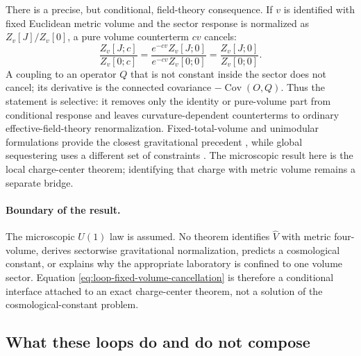 There is a precise, but conditional, field-theory consequence.  If \(v\) is
identified with fixed Euclidean metric volume and the sector response is
normalized as \(Z_v[J]/Z_v[0]\), a pure volume counterterm \(c v\) cancels:
\begin{equation}
 \frac{Z_v[J;c]}{Z_v[0;c]}
 =\frac{e^{-cv}Z_v[J;0]}{e^{-cv}Z_v[0;0]}
 =\frac{Z_v[J;0]}{Z_v[0;0]} .
 \label{eq:loop-fixed-volume-cancellation}
\end{equation}
A coupling to an operator \(Q\) that is not constant inside the sector does
not cancel; its derivative is the connected covariance
\(-\operatorname{Cov}(O,Q)\).  Thus the statement is selective: it removes
only the identity or pure-volume part from conditional response and leaves
curvature-dependent counterterms to ordinary effective-field-theory
renormalization.  Fixed-total-volume and unimodular formulations provide
the closest gravitational precedent \cite{FiolGarriga2010}, while global
sequestering uses a different set of constraints \cite{KaloperPadilla}.
The microscopic result here is the local charge-center theorem; identifying
that charge with metric volume remains a separate bridge.

\paragraph{Boundary of the result.}
The microscopic \(U(1)\) law is assumed.  No theorem identifies
\(\widehat V\) with metric four-volume, derives sectorwise gravitational
normalization, predicts a cosmological constant, or explains why the
appropriate laboratory is confined to one volume sector.  Equation
\eqref{eq:loop-fixed-volume-cancellation} is therefore a conditional
interface attached to an exact charge-center theorem, not a solution of the
cosmological-constant problem.

\subsection{What these loops do and do not compose}
\label{sec:loop-noncomposition}

